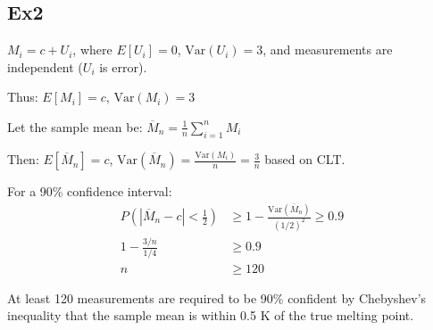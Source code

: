 \documentclass[12pt, a4paper]{article}
\begin{document}
\subsection*{Ex2}
$M_i = c + U_i$, where $E[U_i] = 0$, $\text{Var}(U_i) = 3$, and measurements are independent ($U_i$ is error).

Thus: $E[M_i] = c$, $\text{Var}(M_i) = 3$

Let the sample mean be: $\overline{M}_n = \frac{1}{n} \sum_{i=1}^{n} M_i$

Then: $E[\overline{M}_n] = c$, $\text{Var}(\overline{M}_n) = \frac{\text{Var}(M_i)}{n} = \frac{3}{n}$ based on CLT.

For a 90\% confidence interval:
\begin{align*}
P\left(|\overline{M}_n - c| < \frac{1}{2}\right) &\geq 1 - \frac{\text{Var}(\overline{M}_n)}{(1/2)^2} \geq 0.9 \\
1 - \frac{3/n}{1/4} &\geq 0.9 \\
n &\geq 120
\end{align*}

At least 120 measurements are required to be 90\% confident by Chebyshev's inequality that the sample mean is within 0.5 K of the true melting point.%
\end{document}
